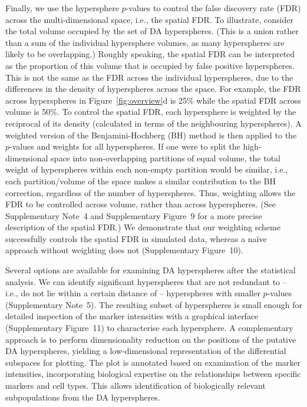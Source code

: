 \documentclass{article}
\newcommand{\suppsecfdr}{4}
\newcommand{\suppsecinterpret}{5}
\newcommand{\suppfigfdrdemo}{9}
\newcommand{\suppfigfdrres}{10}
\newcommand{\suppfiginterpret}{11}
\begin{document}
Finally, we use the hypersphere $p$-values to control the false discovery rate (FDR) across the multi-dimensional space, i.e., the spatial FDR.
To illustrate, consider the total volume occupied by the set of DA hyperspheres.
    (This is a union rather than a sum of the individual hypersphere volumes, as many hyperspheres are likely to be overlapping.)
    Roughly speaking, the spatial FDR can be interpreted as the proportion of this volume that is occupied by false positive hyperspheres.
    This is not the same as the FDR across the individual hyperspheres, due to the differences in the density of hyperspheres across the space.
    For example, the FDR across hyperspheres in Figure~\ref{fig:overview}d is 25\% while the spatial FDR across volume is 50\%.
To control the spatial FDR, each hypersphere is weighted by the reciprocal of its density (calculated in terms of the neighbouring hyperspheres).
    A weighted version of the Benjamini-Hochberg (BH) method \cite{benjamini1997multiple} is then applied to the $p$-values and weights for all hyperspheres.
    If one were to split the high-dimensional space into non-overlapping partitions of equal volume, the total weight of hyperspheres within each non-empty partition would be similar, i.e., each partition/volume of the space makes a similar contribution to the BH correction, regardless of the number of hyperspheres.
    Thus, weighting allows the FDR to be controlled across volume, rather than across hyperspheres.
(See Supplementary Note~\suppsecfdr{} and Supplementary Figure~\suppfigfdrdemo{} for a more precise description of the spatial FDR.)
We demonstrate that our weighting scheme successfully controls the spatial FDR in simulated data, whereas a na\"ive approach without weighting does not (Supplementary Figure~\suppfigfdrres{}).

Several options are available for examining DA hyperspheres after the statistical analysis.
We can identify significant hyperspheres that are not redundant to -- i.e., do not lie within a certain distance of -- hyperspheres with smaller $p$-values (Supplementary Note~\suppsecinterpret{}).
The resulting subset of hyperspheres is small enough for detailed inspection of the marker intensities with a graphical interface (Supplementary Figure~\suppfiginterpret{}) to characterise each hypersphere.
A complementary approach is to perform dimensionality reduction on the positions of the putative DA hyperspheres, yielding a low-dimensional representation of the differential subspaces for plotting.
The plot is annotated based on examination of the marker intensities, incorporating biological expertise on the relationships between specific markers and cell types.
This allows identification of biologically relevant subpopulations from the DA hyperspheres.
\end{document}
